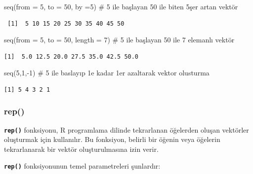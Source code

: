\documentclass[
  letterpaper,
  DIV=11,
  numbers=noendperiod]{scrreprt}
\newenvironment{Shaded}{\begin{snugshade}}{\end{snugshade}}
\newcommand{\AttributeTok}[1]{\textcolor[rgb]{0.40,0.45,0.13}{#1}}
\newcommand{\CommentTok}[1]{\textcolor[rgb]{0.37,0.37,0.37}{#1}}
\newcommand{\DecValTok}[1]{\textcolor[rgb]{0.68,0.00,0.00}{#1}}
\newcommand{\FunctionTok}[1]{\textcolor[rgb]{0.28,0.35,0.67}{#1}}
\newcommand{\NormalTok}[1]{\textcolor[rgb]{0.00,0.23,0.31}{#1}}
\newcommand{\SpecialCharTok}[1]{\textcolor[rgb]{0.37,0.37,0.37}{#1}}
\begin{document}
\begin{Shaded}
\begin{Highlighting}[]
\FunctionTok{seq}\NormalTok{(}\AttributeTok{from =} \DecValTok{5}\NormalTok{, }\AttributeTok{to =} \DecValTok{50}\NormalTok{, }\AttributeTok{by =}\DecValTok{5}\NormalTok{) }\CommentTok{\# 5 ile başlayan 50 ile biten 5şer artan vektör}
\end{Highlighting}
\end{Shaded}

\begin{verbatim}
 [1]  5 10 15 20 25 30 35 40 45 50
\end{verbatim}

\begin{Shaded}
\begin{Highlighting}[]
\FunctionTok{seq}\NormalTok{(}\AttributeTok{from =} \DecValTok{5}\NormalTok{, }\AttributeTok{to =} \DecValTok{50}\NormalTok{, }\AttributeTok{length =} \DecValTok{7}\NormalTok{) }\CommentTok{\# 5 ile başlayan 50 ile 7 elemanlı vektör}
\end{Highlighting}
\end{Shaded}

\begin{verbatim}
[1]  5.0 12.5 20.0 27.5 35.0 42.5 50.0
\end{verbatim}

\begin{Shaded}
\begin{Highlighting}[]
\FunctionTok{seq}\NormalTok{(}\DecValTok{5}\NormalTok{,}\DecValTok{1}\NormalTok{,}\SpecialCharTok{{-}}\DecValTok{1}\NormalTok{) }\CommentTok{\# 5 ile baslayıp 1\textquotesingle{}e kadar 1\textquotesingle{}er azaltarak vektor olusturma}
\end{Highlighting}
\end{Shaded}

\begin{verbatim}
[1] 5 4 3 2 1
\end{verbatim}

\hypertarget{rep}{%
\subsubsection{rep()}\label{rep}}

\textbf{\texttt{rep()}} fonksiyonu, R programlama dilinde tekrarlanan
öğelerden oluşan vektörler oluşturmak için kullanılır. Bu fonksiyon,
belirli bir öğenin veya öğelerin tekrarlanarak bir vektör
oluşturulmasına izin verir.

\textbf{\texttt{rep()}} fonksiyonunun temel parametreleri şunlardır:
\end{document}
